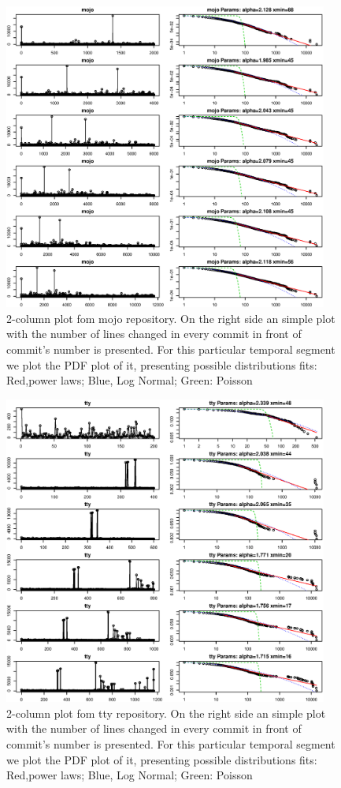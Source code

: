 \documentclass[conference]{IEEEtran}
\begin{document}
     
\begin{figure}[htbp]
	\centerline{\includegraphics[width=0.95\textwidth]{img/mojo_global_estimation.eps}}
	\caption{2-column plot fom mojo repository. On the right side an simple plot with the number of lines changed in every commit in front of commit's number is presented. For this particular temporal segment we plot the PDF plot of it, presenting possible distributions fits: Red,power laws; Blue, Log Normal; Green: Poisson}
	\label{fig:mojo}
      \end{figure}


\begin{figure}[htbp]
	\centerline{\includegraphics[width=0.95\textwidth]{img/tty_global.eps}}
	\caption{2-column plot fom tty repository. On the right side an simple plot with the number of lines changed in every commit in front of commit's number is presented. For this particular temporal segment we plot the PDF plot of it, presenting possible distributions fits: Red,power laws; Blue, Log Normal; Green: Poisson}
	\label{fig:tty}
\end{figure}
\end{document}
